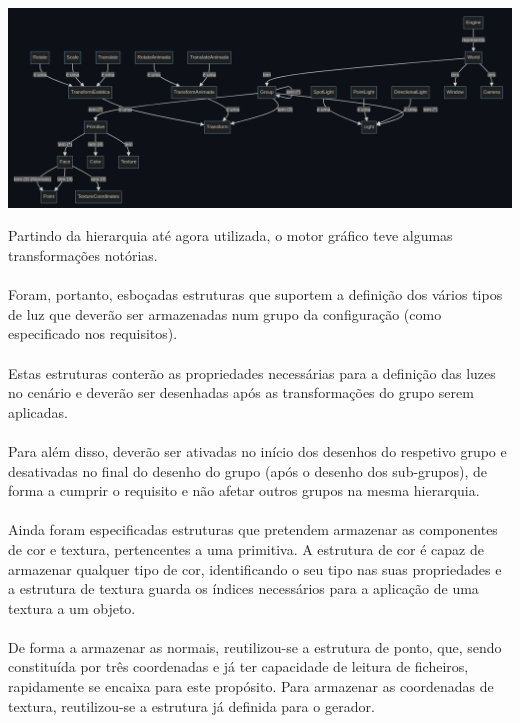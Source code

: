 \begin{center}
    \includegraphics[width=1.0\textwidth]{imgs/concept2.png}
    \label{fig:domeng}
\end{center}

\noindent
Partindo da hierarquia até agora utilizada, o motor gráfico
teve algumas transformações notórias.\\
\\
Foram, portanto, esboçadas estruturas que suportem a definição
dos vários tipos de luz que deverão ser armazenadas num grupo
da configuração (como especificado nos requisitos).\\
\\
Estas estruturas conterão as propriedades necessárias para a
definição das luzes no cenário e deverão ser desenhadas após
as transformações do grupo serem aplicadas.\\
\\
Para além disso, deverão ser ativadas no início dos desenhos
do respetivo grupo e desativadas no final
do desenho do grupo (após o desenho dos sub-grupos), de forma
a cumprir o requisito e não
afetar outros grupos na mesma hierarquia.\\
\\
Ainda foram especificadas estruturas que pretendem armazenar
as componentes de cor e textura, pertencentes a uma primitiva.
A estrutura de cor é capaz de armazenar qualquer tipo de cor,
identificando o seu tipo nas suas propriedades e a estrutura
de textura guarda os índices necessários para a aplicação
de uma textura a um objeto.\\
\\
De forma a armazenar as normais, reutilizou-se a estrutura de
ponto, que, sendo constituída por três coordenadas e já ter
capacidade de leitura de ficheiros, rapidamente se encaixa
para este propósito. Para armazenar as coordenadas de textura,
reutilizou-se a estrutura já definida para o gerador.